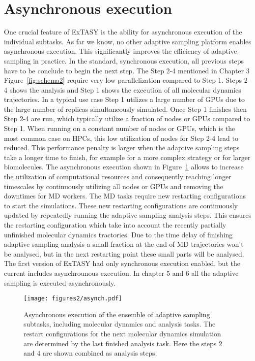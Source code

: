 {\section{\label{sec:asynch}Asynchronous execution}

One crucial feature of ExTASY is the ability for asynchronous execution of the individual subtasks. As far we know, no other adaptive sampling platform enables asynchronous execution. This significantly improves the efficiency of adaptive sampling in practice. In the standard, synchronous execution, all previous steps have to be conclude to begin the next step. 
The Step 2-4 mentioned in Chapter 3 Figure~\ref{fig:schema2} require very low parallelization compared to Step 1. Steps 2-4 shows the analysis and Step 1 shows the execution of all molecular dynamics trajectories. In a typical use case Step 1 utilizes a large number of GPUs due to the large number of replicas simultaneously simulated. Once Step 1 finishes then Step 2-4 are run, which typically utilize a fraction of nodes or GPUs compared to Step 1. When running on a constant number of nodes or GPUs, which is the most common case on HPCs, this low utilization of nodes for Step 2-4 lead to reduced. This performance penalty is larger when the adaptive sampling steps take a longer time to finish, for example for a more complex strategy or for larger biomolecules. The asynchronous execution shown in Figure~\ref{fig:asynch} allows to increase the utilization of computational resources and consequently reaching longer timescales by continuously utilizing all nodes or GPUs and removing the downtimes for MD workers. The MD tasks require new restarting configurations to start the simulations. These new restarting configurations are continuously updated by repeatedly running the adaptive sampling analysis steps. This ensures the restarting configuration which take into account the recently partially unfinished molecular dynamics tractories. Due to the time delay of finishing adaptive sampling analysis a small fraction at the end of MD trajectories won't be analysed, but in the next restarting point these small parts will be analysed.
The first version of ExTASY\cite{Extasy2016} had only synchronous execution enabled, but the current \cite{Extasy2019} includes asynchrounous execution. In chapter 5 and 6 all the adaptive sampling is executed asynchronously. 

\begin{figure}[h]
  \centering
  \texttt{[image: figures2/asynch.pdf]}
  \caption{Asynchronous execution of the ensemble of adaptive sampling subtasks, including molecular dynamics and analysis tasks. The restart configurations for the next molecular dynamics simulation are determined by the last finished analysis task. Here the steps 2 and 4 are shown combined as analysis steps.}
  \label{fig:asynch}
\end{figure}



}
